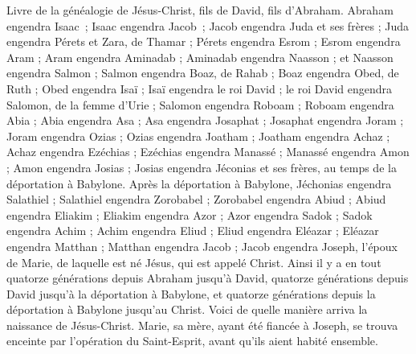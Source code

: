 \BFont
\begin{multicols}{2}
\VerseOne{}Livre de la généalogie de Jésus-Christ, fils de David, fils d’Abraham.
Abraham engendra Isaac ; Isaac engendra Jacob ; Jacob engendra Juda et ses frères ;
Juda engendra Pérets et Zara, de Thamar ; Pérets engendra Esrom ; Esrom engendra Aram ;
Aram engendra Aminadab ; Aminadab engendra Naasson ; et Naasson engendra Salmon ;
Salmon engendra Boaz, de Rahab{} ; Boaz engendra Obed, de Ruth{} ; Obed engendra Isaï ;
Isaï engendra le roi David ; le roi David engendra Salomon, de la femme d'Urie ;
Salomon engendra Roboam ; Roboam engendra Abia ; Abia engendra Asa ;
Asa engendra Josaphat ; Josaphat engendra Joram ; Joram engendra Ozias ;
Ozias engendra Joatham ; Joatham engendra Achaz ; Achaz engendra Ezéchias ;
Ezéchias engendra Manassé ; Manassé engendra Amon ; Amon engendra Josias ;
Josias engendra Jéconias et ses frères, au temps de la déportation à Babylone.
Après la déportation à Babylone, Jéchonias engendra Salathiel ; Salathiel engendra Zorobabel ;
Zorobabel engendra Abiud ; Abiud engendra Eliakim ; Eliakim engendra Azor ;
Azor engendra Sadok ; Sadok engendra Achim ; Achim engendra Eliud ;
Eliud engendra Eléazar ; Eléazar engendra Matthan ; Matthan engendra Jacob ;
Jacob engendra Joseph, l’époux de Marie, de laquelle est né Jésus, qui est appelé Christ{}.
Ainsi il y a en tout quatorze générations depuis Abraham jusqu'à David, quatorze générations depuis David jusqu'à la déportation à Babylone, et quatorze générations depuis la déportation à Babylone jusqu'au Christ.
Voici de quelle manière arriva la naissance de Jésus-Christ. Marie, sa mère, ayant été fiancée à Joseph, se trouva enceinte par l’opération du Saint-Esprit, avant qu'ils aient habité ensemble.

\end{multicols}
